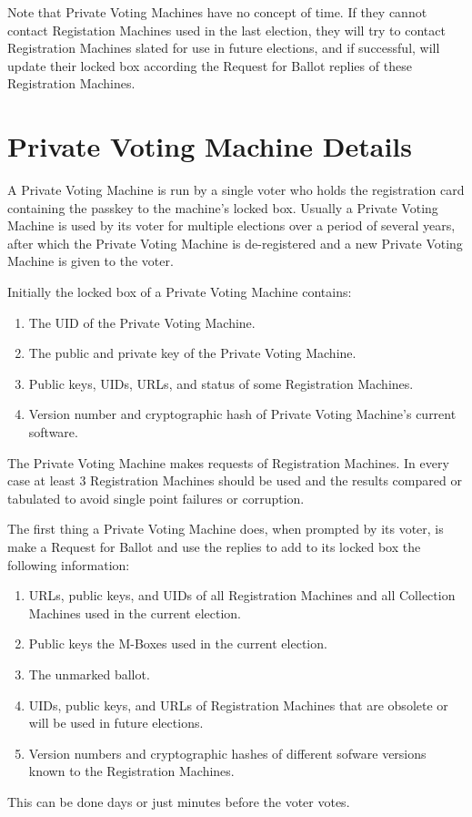 \documentclass[12pt]{article}
\begin{document}
Note that Private Voting Machines have no concept of time.
If they cannot contact Registation Machines used in the last
election, they will try to contact Registration Machines
slated for use in future elections, and if successful, will
update their locked box according the Request for Ballot
replies of these Registration Machines.

\section{Private Voting Machine Details}

A Private Voting Machine is run by a single voter
who holds the registration card containing the passkey to
the machine's locked box.  Usually a Private Voting Machine
is used by its voter for multiple elections over a period
of several years, after which the Private Voting Machine
is de-registered and a new Private Voting Machine
is given to the voter.

Initially the locked box of a Private Voting Machine contains:
\begin{enumerate}
\item The UID of the Private Voting Machine.
\item The public and private key of the Private Voting Machine.
\item Public keys, UIDs, URLs, and status of some Registration Machines.
\item Version number and cryptographic hash of Private Voting Machine's current
      software.
\setcounter{PVM-COUNTER}{\value{enumi}}
\end{enumerate}

The Private Voting Machine
makes requests of Registration Machines.  In every case
at least 3 Registration Machines should be used and the
results compared or tabulated to avoid single point failures or corruption.

The first thing a Private Voting Machine does, when prompted by
its voter, is make a Request for Ballot and use the replies to
add to its locked box the following information:
\begin{enumerate}
\setcounter{enumi}{\value{PVM-COUNTER}}
\item URLs, public keys, and UIDs
of all Registration Machines and all Collection
Machines used in the current election.
\item Public keys the M-Boxes used in the current election.
\item The unmarked ballot.
\item UIDs, public keys, and URLs of Registration Machines that are
obsolete or will be used in future elections.
\item Version numbers and cryptographic hashes of different sofware versions
known to the Registration Machines.
\end{enumerate}
This can be done days or just minutes before the voter votes.
\end{document}
